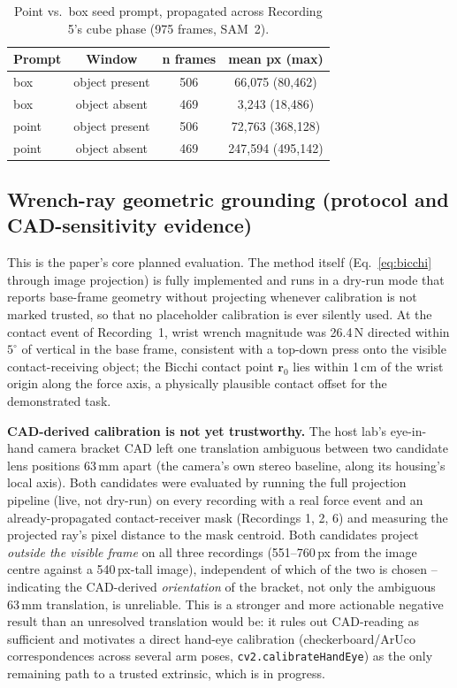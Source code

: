\documentclass[letterpaper, 10pt, journal, twoside]{IEEEtran}
\begin{document}
\begin{table}[t]
\centering
\caption{Point vs.\ box seed prompt, propagated across Recording 5's
cube phase (975 frames, SAM~2).}
\label{tab:seedablation}
\begin{tabular}{lccc}
\toprule
\textbf{Prompt} & \textbf{Window} & \textbf{n frames} & \textbf{mean px (max)} \\
\midrule
box   & object present & 506 & 66{,}075 (80{,}462) \\
box   & object absent  & 469 & 3{,}243 (18{,}486) \\
point & object present & 506 & 72{,}763 (368{,}128) \\
point & object absent  & 469 & 247{,}594 (495{,}142) \\
\bottomrule
\end{tabular}
\end{table}

\subsection{Wrench-ray geometric grounding (protocol and CAD-sensitivity evidence)}

This is the paper's core planned evaluation. The method itself
(Eq.~\ref{eq:bicchi} through image projection) is fully implemented and
runs in a dry-run mode that reports base-frame geometry without
projecting whenever calibration is not marked trusted, so that no
placeholder calibration is ever silently used. At the contact event of
Recording~1, wrist wrench magnitude was 26.4\,N directed within
$5^\circ$ of vertical in the base frame, consistent with a top-down
press onto the visible contact-receiving object; the Bicchi contact
point $\mathbf{r}_0$ lies within 1\,cm of the wrist origin along the
force axis, a physically plausible contact offset for the demonstrated
task.

\textbf{CAD-derived calibration is not yet trustworthy.} The host lab's
eye-in-hand camera bracket CAD left one translation ambiguous between two
candidate lens positions 63\,mm apart (the camera's own stereo baseline,
along its housing's local axis). Both candidates were evaluated by
running the full projection pipeline (live, not dry-run) on every
recording with a real force event and an already-propagated
contact-receiver mask (Recordings 1, 2, 6) and measuring the projected
ray's pixel distance to the mask centroid. Both candidates project
\emph{outside the visible frame} on all three recordings (551--760\,px
from the image centre against a 540\,px-tall image), independent of
which of the two is chosen -- indicating the CAD-derived
\emph{orientation} of the bracket, not only the ambiguous 63\,mm
translation, is unreliable. This is a stronger and more actionable
negative result than an unresolved translation would be: it rules out
CAD-reading as sufficient and motivates a direct hand-eye calibration
(checkerboard/ArUco correspondences across several arm poses,
\texttt{cv2.calibrateHandEye}) as the only remaining path to a trusted
extrinsic, which is in progress.
\end{document}

